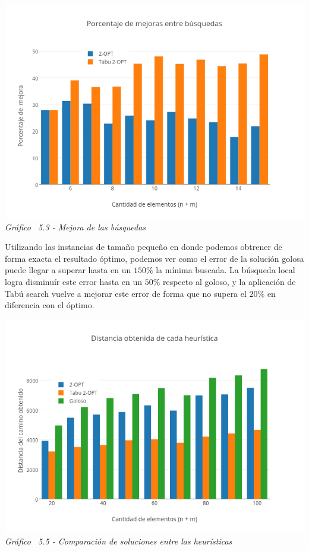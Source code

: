   \vspace*{0.3cm} \vspace*{0.3cm}
  \begin{center}
 \includegraphics[scale=0.5]{./EJ5/mejoraChico.png}\\
 {\textit{Gráfico \ 5.3 - Mejora de las búsquedas}}
  \end{center}
  \vspace*{0.3cm}

Utilizando las instancias de tamaño pequeño en donde podemos obtrener de forma exacta el resultado óptimo, podemos ver como el error de la solución golosa puede llegar a superar hasta en un $150\%$ la mínima buscada. La búsqueda local logra disminuír este error hasta en un $50\%$ respecto al goloso, y la aplicación de Tabú search vuelve a mejorar este error de forma que no supera el $20\%$ en diferencia con el óptimo.


\vspace*{0.3cm} \vspace*{0.3cm}
  \begin{center}
 \includegraphics[scale=0.5]{./EJ5/comparativo1.png}\\
 {\textit{Gráfico \ 5.5 - Comparaci\'on de soluciones entre las heur\'isticas}}
  \end{center}
  \vspace*{0.3cm}
  

